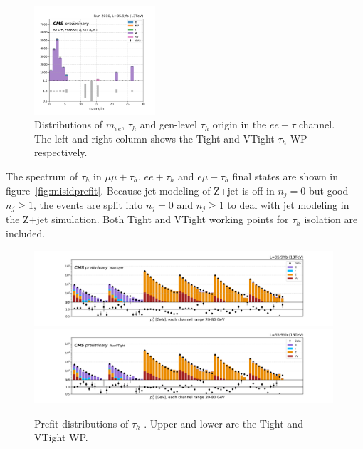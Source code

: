 \begin{figure}
    \includegraphics[width=0.4\textwidth]{chapters/Analysis/sectionCalibration/figures/jetToTauh/eetau_tauGenFlavor_pickles_lltauVTight.png}
    \caption{Distributions of $m_{ee}$, $\tau_h$ \pt and gen-level $\tau_h$ origin in the $ee+\tau$ channel. The left and right column shows the Tight and VTight $\tau_h$ WP respectively.}
    \label{fig:appendix:fakeTauId:eetau}
\end{figure}


The \pt spectrum of $\tau_h$ in $\mu\mu+\tau_h$, $ee+\tau_h$ and $e\mu+\tau_h$ final states are shown in figure~\ref{fig:misidprefit}. Because jet modeling of Z+jet is off in $n_j=0$ but good $n_j \geq 1$, the events are split into $n_j=0$ and $n_j \geq 1$ to deal with jet modeling in the Z+jet simulation. Both Tight and VTight working points for $\tau_h$ isolation are included.



\begin{figure}
    \centering
    \includegraphics[width=0.99\textwidth]{chapters/Analysis/sectionCalibration/figures/jetToTauh/2020_tauID_prefit_lltauTight.png}
    \includegraphics[width=0.99\textwidth]{chapters/Analysis/sectionCalibration/figures/jetToTauh/2020_tauID_prefit_lltauVTight.png}
    \caption{Prefit distributions of $\tau_h$ \pt. Upper and lower are the Tight and VTight WP.}
    \label{fig:appendix:fakeTauId:prefit}
\end{figure}

